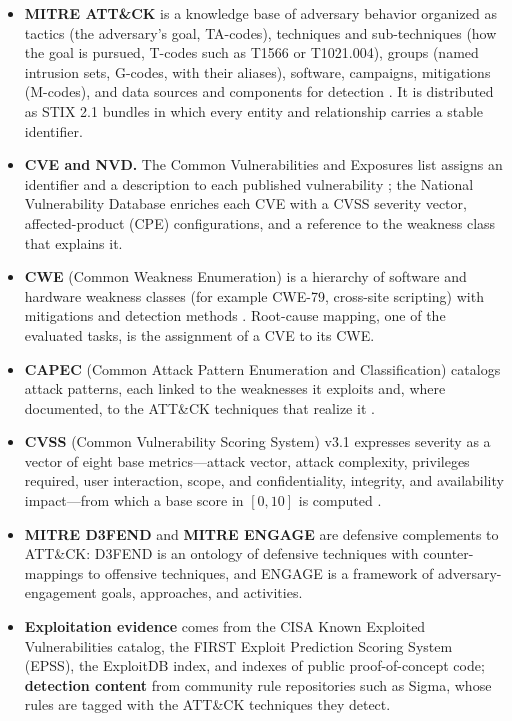 \documentclass[a4paper,fleqn]{cas-dc}
\begin{document}
\begin{itemize}
\item \textbf{MITRE ATT\&CK} is a knowledge base of adversary behavior organized as tactics (the adversary's goal, TA-codes), techniques and sub-techniques (how the goal is pursued, T-codes such as T1566 or T1021.004), groups (named intrusion sets, G-codes, with their aliases), software, campaigns, mitigations (M-codes), and data sources and components for detection \citep{strom2018mitre}. It is distributed as STIX 2.1 bundles in which every entity and relationship carries a stable identifier.
\item \textbf{CVE and NVD.} The Common Vulnerabilities and Exposures list assigns an identifier and a description to each published vulnerability \citep{mitreCVE}; the National Vulnerability Database enriches each CVE with a CVSS severity vector, affected-product (CPE) configurations, and a reference to the weakness class that explains it.
\item \textbf{CWE} (Common Weakness Enumeration) is a hierarchy of software and hardware weakness classes (for example CWE-79, cross-site scripting) with mitigations and detection methods \citep{mitreCWE}. Root-cause mapping, one of the evaluated tasks, is the assignment of a CVE to its CWE.
\item \textbf{CAPEC} (Common Attack Pattern Enumeration and Classification) catalogs attack patterns, each linked to the weaknesses it exploits and, where documented, to the ATT\&CK techniques that realize it \citep{mitreCAPEC}.
\item \textbf{CVSS} (Common Vulnerability Scoring System) v3.1 expresses severity as a vector of eight base metrics---attack vector, attack complexity, privileges required, user interaction, scope, and confidentiality, integrity, and availability impact---from which a base score in $[0,10]$ is computed \citep{first2019cvss}.
\item \textbf{MITRE D3FEND} and \textbf{MITRE ENGAGE} are defensive complements to ATT\&CK: D3FEND is an ontology of defensive techniques with counter-mappings to offensive techniques, and ENGAGE is a framework of adversary-engagement goals, approaches, and activities.
\item \textbf{Exploitation evidence} comes from the CISA Known Exploited Vulnerabilities catalog, the FIRST Exploit Prediction Scoring System (EPSS), the ExploitDB index, and indexes of public proof-of-concept code; \textbf{detection content} from community rule repositories such as Sigma, whose rules are tagged with the ATT\&CK techniques they detect.
\end{itemize}
\end{document}
